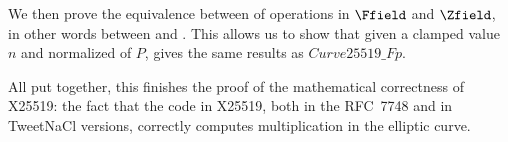 We then prove the equivalence between of operations in $\Ffield$ and $\Zfield$,
in other words between  and .
This allows us to show that given a clamped value $n$ and normalized \xcoord of $P$,
 gives the same results as $Curve25519\_Fp$.

All put together, this finishes the proof of the mathematical correctness of X25519: the fact that the code in X25519, both in the RFC~7748 and
in TweetNaCl versions, correctly computes multiplication in the elliptic curve.
